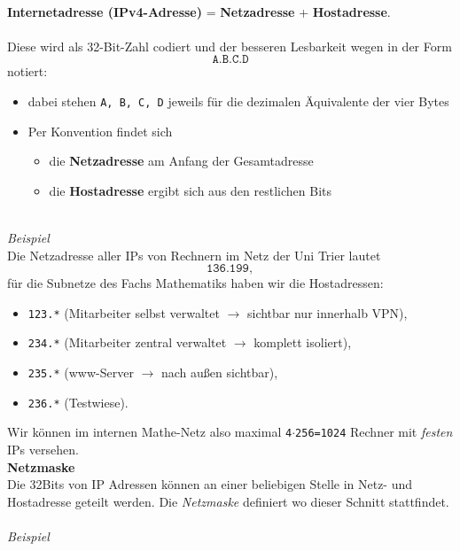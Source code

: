 ~\\
\textbf{Internetadresse (IPv4-Adresse)} = \textbf{Netzadresse} + \textbf{Hostadresse}.\\~\\[-0.2cm]
Diese wird als 32-Bit-Zahl codiert und der besseren Lesbarkeit wegen in der Form 
$$\texttt{A.B.C.D}$$
notiert: 
\begin{itemize}
	\item dabei stehen \texttt{A, B, C, D} jeweils für die dezimalen Äquivalente der vier Bytes
	\item Per Konvention findet sich 
	\begin{itemize}
		\item die \textbf{Netzadresse} am Anfang der Gesamtadresse
		\item die \textbf{Hostadresse} ergibt sich aus den restlichen Bits
	\end{itemize}
\end{itemize}
~\\
\textit{Beispiel}\\
Die Netzadresse aller IPs von Rechnern im Netz der Uni Trier lautet
$$\texttt{136.199},$$
für die Subnetze des Fachs Mathematiks haben wir die Hostadressen:
\begin{itemize}
	\item \texttt{123.*} (Mitarbeiter selbst verwaltet $\to$ sichtbar nur innerhalb VPN), 
	\item \texttt{234.*} (Mitarbeiter zentral verwaltet $\to$ komplett isoliert), 
	\item \texttt{235.*} (www-Server $\to$ nach außen sichtbar), 
	\item \texttt{236.*} (Testwiese).
\end{itemize}
Wir können im internen Mathe-Netz also maximal \texttt{4$\cdot$256=1024} Rechner mit \textit{festen} IPs versehen.
%
~\\
\textbf{Netzmaske}\\
Die 32Bits von IP Adressen können an einer beliebigen Stelle in Netz- und Hostadresse geteilt werden. Die \textit{Netzmaske} definiert wo dieser Schnitt stattfindet.\\~\\
\textit{Beispiel}\\
